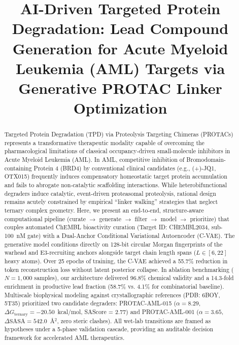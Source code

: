 \documentclass[conference]{IEEEtran}
\begin{document}
\title{AI-Driven Targeted Protein Degradation: Lead Compound Generation for Acute Myeloid Leukemia (AML) Targets via Generative PROTAC Linker Optimization}

\author{
\and
{}
}

\maketitle

\begin{abstract}
Targeted Protein Degradation (TPD) via Proteolysis Targeting Chimeras (PROTACs) represents a transformative therapeutic modality capable of overcoming the pharmacological limitations of classical occupancy-driven small-molecule inhibitors in Acute Myeloid Leukemia (AML). In AML, competitive inhibition of Bromodomain-containing Protein 4 (BRD4) by conventional clinical candidates (e.g., (+)-JQ1, OTX015) frequently induces compensatory homeostatic target protein accumulation and fails to abrogate non-catalytic scaffolding interactions. While heterobifunctional degraders induce catalytic, event-driven proteasomal proteolysis, rational design remains acutely constrained by empirical ``linker walking'' strategies that neglect ternary complex geometry. Here, we present an end-to-end, structure-aware computational pipeline (curate $\rightarrow$ generate $\rightarrow$ filter $\rightarrow$ model $\rightarrow$ prioritize) that couples automated ChEMBL bioactivity curation (Target ID: CHEMBL2034, sub-100~nM gate) with a Dual-Anchor Conditional Variational Autoencoder (C-VAE). The generative model conditions directly on 128-bit circular Morgan fingerprints of the warhead and E3-recruiting anchors alongside target chain length spans ($L \in [6, 22]$ heavy atoms). Over 25 epochs of training, the C-VAE achieved a 55.7\% reduction in token reconstruction loss without latent posterior collapse. In ablation benchmarking ($N = 1,000$ samples), our architecture delivered 96.8\% chemical validity and a 14.3-fold enrichment in productive lead fraction (58.7\% vs. 4.1\% for combinatorial baseline). Multiscale biophysical modeling against crystallographic references (PDB: 6BOY, 5T35) prioritized two candidate degraders: PROTAC-AML-015 ($\alpha = 8.29$, $\Delta G_{\text{ternary}} = -20.50$~kcal/mol, SAScore = 2.77) and PROTAC-AML-001 ($\alpha = 3.65$, $\Delta\text{SASA} = 542.0$~\AA$^2$, zero steric clashes). All wet-lab transitions are framed as hypotheses under a 5-phase validation cascade, providing an auditable decision framework for accelerated AML therapeutics.
\end{abstract}
\end{document}
